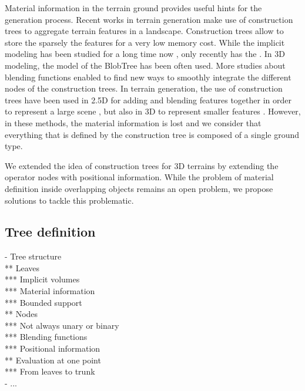 Material information in the terrain ground provides useful hints for the generation process. Recent works in terrain generation make use of construction trees to aggregate terrain features in a landscape. Construction trees allow to store the sparsely the features for a very low memory cost. While the implicit modeling has been studied for a long time now \cite{Turk2001}, only recently has the . In 3D modeling, the model of the BlobTree\cite{Schmidt2006} has been often used. More studies about blending functions \cite{Barthe2004,Bernhardt2010,DeGroot2014,Vaillant2013,Angles2017} enabled to find new ways to smoothly integrate the different nodes of the construction trees. In terrain generation, the use of construction trees have been used in 2.5D for adding and blending features together in order to represent a large scene \cite{Genevaux2015,Guerin2016}, but also in 3D to represent smaller features \cite{Paris2021a}. However, in these methods, the material information is lost and we consider that everything that is defined by the construction tree is composed of a single ground type. 

We extended the idea of construction trees for 3D terrains by extending the operator nodes with positional information. While the problem of material definition inside overlapping objects remains an open problem, we propose solutions to tackle this problematic.




\subsection{Tree definition}
- Tree structure \\
** Leaves \\
*** Implicit volumes \\
*** Material information \\
*** Bounded support \\
** Nodes \\
*** Not always unary or binary \\
*** Blending functions \\
*** Positional information \\
** Evaluation at one point \\
*** From leaves to trunk \\
- ... 

